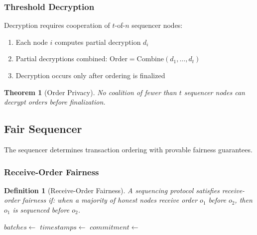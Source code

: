 \documentclass[11pt,a4paper]{article}
\newtheorem{definition}{Definition}
\newtheorem{theorem}{Theorem}
\begin{document}
\subsubsection{Threshold Decryption}

Decryption requires cooperation of $t$-of-$n$ sequencer nodes:

\begin{enumerate}
    \item Each node $i$ computes partial decryption $d_i$
    \item Partial decryptions combined: $\text{Order} = \text{Combine}(d_1, \ldots, d_t)$
    \item Decryption occurs only after ordering is finalized
\end{enumerate}

\begin{theorem}[Order Privacy]
No coalition of fewer than $t$ sequencer nodes can decrypt orders before finalization.
\end{theorem}

\subsection{Fair Sequencer}

The sequencer determines transaction ordering with provable fairness guarantees.

\subsubsection{Receive-Order Fairness}

\begin{definition}[Receive-Order Fairness]
A sequencing protocol satisfies receive-order fairness if: when a majority of honest nodes receive order $o_1$ before $o_2$, then $o_1$ is sequenced before $o_2$.
\end{definition}

\begin{algorithm}
\caption{Fair Ordering Protocol}
\begin{algorithmic}[1]
    \State $batches \gets$ 
        \State $timestamps \gets$ 
        \State {}
        \State $commitment \gets$ 
        \State {}
        \State {}
        \State {}
    \EndFor
\EndProcedure
\end{algorithmic}
\end{algorithm}
\end{document}
